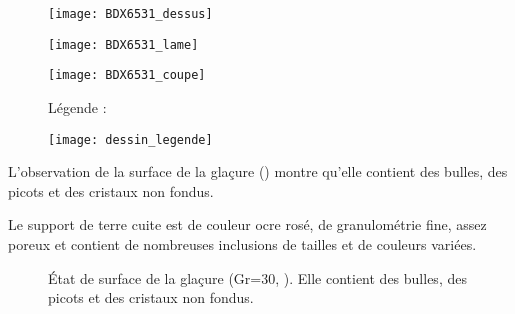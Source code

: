 \begin{figure}[htb]
  \begin{minipage}[t]{0.5\textwidth}
    \centerfloat
    \vspace*{0pt}
    \texttt{[image: BDX6531\_dessus]}
  \end{minipage}%
  \quad%
  \begin{minipage}[t]{0.5\textwidth}
    \centerfloat
    \vspace*{0pt}
    \texttt{[image: BDX6531\_lame]}
  \end{minipage}

  \bigskip

  \begin{minipage}[t]{0.5\textwidth}
    \centerfloat
    \vspace*{0pt}
    \texttt{[image: BDX6531\_coupe]}
  \end{minipage}%
  \quad%
  \begin{minipage}[t]{0.5\textwidth}
    \vspace*{0pt}
    Légende :

    \texttt{[image: dessin\_legende]}
  \end{minipage}
  \caption{\legendeD}
  \label{dessin:6531}
\end{figure}

L'observation de la surface de la glaçure () montre 
qu'elle contient des bulles, des picots et des cristaux non fondus.

Le support de terre cuite est de couleur ocre rosé, de granulométrie
fine, assez poreux et contient de nombreuses inclusions de tailles et
de couleurs variées.

\begin{figure}[htb]
  \caption{\legendeD 
           État de surface de la glaçure (Gr=30, ). Elle contient des bulles, des 
           picots et des cristaux non fondus.}
  \label{surf:6531}
\end{figure}


